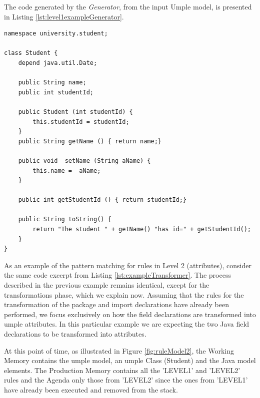 The code generated by the \textit{Generator}, from the input Umple model, is presented in Listing \ref{lst:level1exampleGenerator}.

\begin{lstlisting}[style=umpleOut, label=lst:level1exampleGenerator, caption=Umple code generated -- Level 1]
namespace university.student;

class Student {
	depend java.util.Date;
	
    public String name;
    public int studentId;
    
    public Student (int studentId) {
    	this.studentId = studentId;
    }
    public String getName () { return name;}
    
    public void  setName (String aName) { 
    	this.name =  aName;
    }
   
    public int getStudentId () { return studentId;}
    
    public String toString() {
    	return "The student " + getName() "has id=" + getStudentId();
    }
}   
\end{lstlisting}

As an example of the pattern matching for rules in Level 2 (attributes), consider the same code excerpt from Listing \ref{lst:exampleTransformer}. The process described in the previous example remains identical, except for the transformations phase, which we explain now. Assuming that the rules for the transformation of the package and import declarations have already been performed, we focus exclusively on how the field declarations are transformed into umple attributes. In this particular example we are expecting the two Java field declarations to be transformed into attributes. 

At this point of time, as illustrated in Figure \ref{fig:ruleModel2}, the Working Memory contains the umple model, an umple Class (Student) and the Java model elements. The Production Memory contains all the 'LEVEL1' and 'LEVEL2' rules and the Agenda only those from 'LEVEL2' since the ones from 'LEVEL1' have already been executed and removed from the stack.


